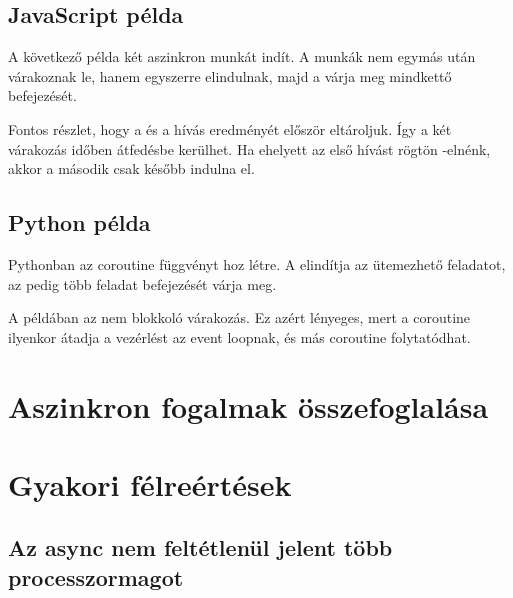 \subsection{JavaScript példa}

A következő példa két aszinkron munkát indít. A munkák nem egymás után várakoznak le, hanem egyszerre elindulnak, majd a  várja meg mindkettő befejezését.


Fontos részlet, hogy a  és a  hívás eredményét először eltároljuk. Így a két várakozás időben átfedésbe kerülhet. Ha ehelyett az első hívást rögtön -elnénk, akkor a második csak később indulna el.

\subsection{Python példa}

Pythonban az  coroutine függvényt hoz létre. A  elindítja az ütemezhető feladatot, az  pedig több feladat befejezését várja meg.


A példában az  nem blokkoló várakozás. Ez azért lényeges, mert a coroutine ilyenkor átadja a vezérlést az event loopnak, és más coroutine folytatódhat.

\section{Aszinkron fogalmak összefoglalása}

\begin{center}

\end{center}

\section{Gyakori félreértések}

\subsection{Az async nem feltétlenül jelent több processzormagot}

